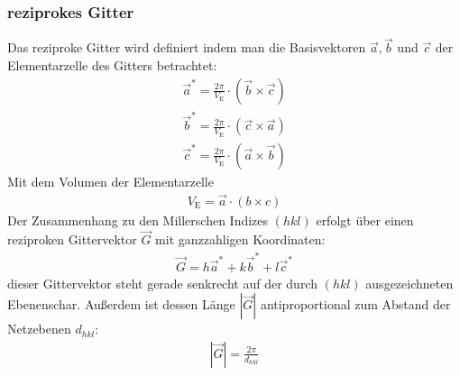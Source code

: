 \documentclass[11pt, a4paper]{article}
\begin{document}
\subsubsection{reziprokes Gitter}
Das reziproke Gitter wird definiert indem man die Basisvektoren $\vec{a}, \vec{b}$ und $\vec{c}$ der Elementarzelle des Gitters betrachtet\cite{demtroeder}:
\begin{align}
  \vec{a}^{*} = \frac{2\pi}{V_\mathrm{E}} \cdot ( \vec{b} \times \vec{c} ) \nonumber\\
  \vec{b}^{*} = \frac{2\pi}{V_\mathrm{E}} \cdot ( \vec{c} \times \vec{a} ) \nonumber\\
  \vec{c}^{*} = \frac{2\pi}{V_\mathrm{E}} \cdot ( \vec{a} \times \vec{b} )
\end{align}
Mit dem Volumen der Elementarzelle
\begin{align}
  V_\mathrm{E} = \vec{a} \cdot \left( b \times c \right)
\end{align}
Der Zusammenhang zu den Millerschen Indizes $(hkl)$ erfolgt über einen reziproken Gittervektor $\vec{G}$ mit ganzzahligen Koordinaten:
\begin{align}
  \vec{G} = h \vec{a}^{*} + k \vec{b}^{*} + l \vec{c}^{*}
  \label{eq:rezip_miller}
\end{align}
dieser Gittervektor steht gerade senkrecht auf der durch $(hkl)$ ausgezeichneten Ebenenschar. Außerdem ist dessen Länge $| \vec{G} |$ antiproportional zum Abstand der Netzebenen $d_{hkl}$:
\begin{align}
  | \vec{G} | = \frac{2\pi}{d_{hkl}}
  \label{eq:netzebenenabstand}
\end{align}
\end{document}
